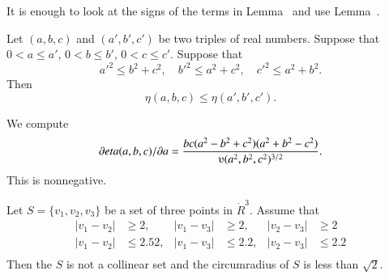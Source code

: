 \begin{tarskidata}
\begin{tarski}

\begin{proved} It is enough to look at the signs of the terms in
Lemma~ and use Lemma~.
\swallowed\end{proved}
\end{tarski}





\begin{tarski}

\begin{lemma}
Let $(a,b,c)$ and $(a',b',c')$ be two triples of real numbers.
Suppose that $0 < a\le a'$, $0 < b\le b'$, $0< c\le c'$.  Suppose that
   $$
   a'^2 \le b^2 + c^2,\quad b'^2 \le a^2 + c^2,\quad c'^2\le a^2 + b^2.
   $$
Then
   $$
   \eta(a,b,c) \le \eta(a',b',c').
   $$
\end{lemma}


\begin{proved} We compute
	$$\partial\eta(a,b,c)/\partial a = 
        \frac{b c (a^2 - b^2 + c^2)(a^2 + b^2 - c^2)}{\ups(a^2,b^2,c^2)^{3/2}}.
	$$
This is nonnegative.  
\swallowed\end{proved}
\end{tarski}





\begin{tarski}

\begin{lemma}
Let $S=\{v_1,v_2,v_3\}$ be a set of three points in $\ring{R}^3$.
Assume that
	$$
	\begin{array}{rlrlrl}
	|v_1-v_2|&\ge 2,  &|v_1-v_3|&\ge 2,   &|v_2-v_3|&\ge 2\\
	|v_1-v_2|&\le 2.52, &|v_1-v_3|&\le 2.2, &|v_2-v_3|&\le 2.2\\
	\end{array}
	$$
Then the $S$ is not a collinear set and the circumradius of 
$S$ is less than $\sqrt2$.
\end{lemma}


\end{tarski}
\end{tarskidata}
